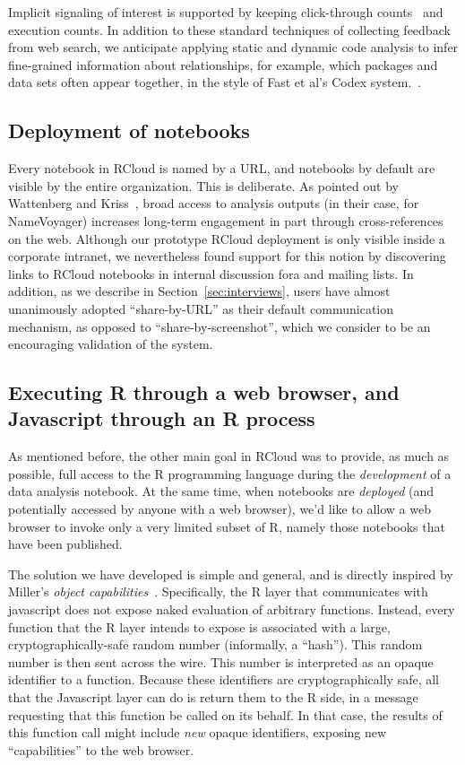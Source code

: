 Implicit signaling of interest is supported by keeping click-through
counts~\cite{Joachims:2005:AIC} and execution counts. In addition to
these standard techniques of collecting feedback from web search, we
anticipate applying static and dynamic code analysis to infer
fine-grained information about relationships, for example, which
packages and data sets often appear together, in the style of Fast et
al's Codex system.~\cite{Fast:2014:ECS}.

\subsection{Deployment of notebooks\label{sec:deployment}}

Every notebook in RCloud is named by a URL, and notebooks by default
are visible by the entire organization. This is deliberate.  As
pointed out by Wattenberg and Kriss~\cite{Wattenberg:2011:DFS}, broad
access to analysis outputs (in their case, for NameVoyager) increases
long-term engagement in part through cross-references on the
web. Although our prototype RCloud deployment is only visible inside a
corporate intranet, we nevertheless found support for this notion by
discovering links to RCloud notebooks in internal discussion fora and
mailing lists. In addition, as we describe in
Section~\ref{sec:interviews}, users have almost unanimously adopted
``share-by-URL'' as their default communication mechanism, as opposed
to ``share-by-screenshot'', which we consider to be an encouraging
validation of the system.

\subsection{Executing R through a web browser, and Javascript through an R process\label{sec:Rinbrowser}}

As mentioned before, the other main goal in RCloud was to provide, as
much as possible, full access to the R programming language during the
\emph{development} of a data analysis notebook.
At the same time, when notebooks are \emph{deployed} (and potentially
accessed by anyone with a web browser), we'd like to allow a web
browser to invoke only a very limited subset of R, namely those
notebooks that have been published.

The solution we have developed is simple and general, and is directly
inspired by Miller's \emph{object
  capabilities}~\cite{Miller:2006:RCT}. Specifically, the R layer that
communicates with javascript does not expose naked evaluation of
arbitrary functions. Instead, every function that the R layer intends
to expose is associated with a large, cryptographically-safe random
number (informally, a ``hash''). This random number is then sent
across the wire. This number is interpreted as an opaque identifier to
a function. Because these identifiers are cryptographically safe, all
that the Javascript layer can do is return them to the R side, in a
message requesting that this function be called on its behalf. In that
case, the results of this function call might include \emph{new}
opaque identifiers, exposing new ``capabilities'' to the web browser.

